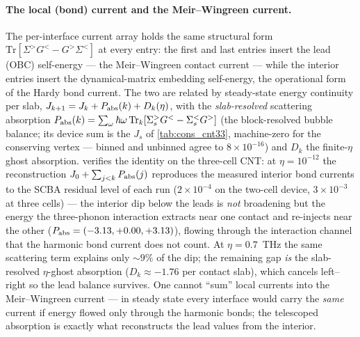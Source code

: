 \paragraph{The local (bond) current and the Meir--Wingreen current.}
The per-interface current array holds the same structural form
$\mathrm{Tr}[\Sigma^>G^<-G^>\Sigma^<]$ at every entry: the first and last
entries insert the lead (OBC) self-energy --- the Meir--Wingreen contact
current --- while the interior entries insert the dynamical-matrix embedding
self-energy, the operational form of the Hardy bond current. The two are
related by steady-state energy continuity per slab,
$J_{k+1}=J_k+P_{\rm abs}(k)+D_k(\eta)$, with the \emph{slab-resolved}
scattering absorption $P_{\rm abs}(k)=\sum_\omega\hbar\omega\,
\mathrm{Tr}_k[\Sigma_s^>G^<-\Sigma_s^<G^>]$ (the block-resolved bubble
balance; its device sum is the $J_s$ of \cref{tab:cons_cnt33}, machine-zero
for the conserving vertex --- binned and unbinned agree to $8\times10^{-16}$)
and $D_k$ the finite-$\eta$ ghost absorption. 
verifies the identity on the three-cell CNT: at $\eta=10^{-12}$ the
reconstruction $J_0+\sum_{j<k}P_{\rm abs}(j)$ reproduces the measured
interior bond currents to the SCBA residual level of each run
($2\times10^{-4}$ on the two-cell device, $3\times10^{-3}$ at three cells)
--- the interior dip below the leads is \emph{not} broadening but the
energy the three-phonon interaction extracts near one contact and re-injects
near the other ($P_{\rm abs}=(-3.13,+0.00,+3.13)$), flowing through the
interaction channel that the harmonic bond current does not count. At
$\eta=0.7$~THz the same scattering term explains only $\sim9\%$ of the dip;
the remaining gap \emph{is} the slab-resolved $\eta$-ghost absorption
($D_k\approx-1.76$ per contact slab), which cancels left--right so the lead
balance survives. One cannot ``sum'' local currents into the Meir--Wingreen
current --- in steady state every interface would carry the \emph{same}
current if energy flowed only through the harmonic bonds; the telescoped
absorption is exactly what reconstructs the lead values from the interior.

